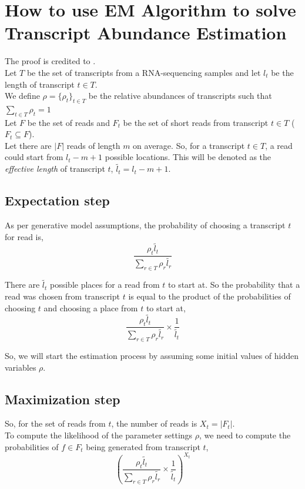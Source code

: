\section{How to use EM Algorithm to solve Transcript Abundance Estimation}
The proof is credited to \cite{pachter2011models}.\\
Let $T$ be the set of transcripts from a RNA-sequencing samples and let $l_t$ be the length of transcript $t \in T$.\\
We define $\rho = \{\rho_t\}_{t \in T}$ be the relative abundances of transcripts such that $\sum_{t \in T}{\rho_t}=1$\\
Let $F$ be the set of reads and $F_t$ be the set of short reads from transcript $t \in T$ ($F_t \subseteq F$).\\
 Let there are $\lvert F \rvert$ reads of length $m$ on average. So, for a transcript $t \in T$, a read could start from $l_t-m+1$ possible locations. This will be denoted as the \textit{effective length} of transcript $t$, $\tilde{l_t}= l_t-m+1$.\\

\subsection{Expectation step} 
As per generative model assumptions, the probability of choosing a transcript $t$ for read is,
\begin{displaymath}
\frac{ {\rho_t}{\tilde{l_t}}  }{ \sum_{r \in T}{ {\rho_r}{\tilde{l_r}}} }
\end{displaymath}

There are $\tilde{l_t}$ possible places for a read from $t$ to start at. So the probability that a read was chosen from transcript $t$ is equal to the product of the probabilities of choosing $t$ and choosing a place from $t$ to start at,
\begin{displaymath}
\frac{ {\rho_t} {\tilde{l_t}}  }{ \sum_{r \in T} { {\rho_r}{\tilde{l_r}}} }
\times \frac{1}{\tilde{l_t}}
\end{displaymath}    

So, we will start the estimation process by assuming some initial values of hidden variables $\rho$.
\subsection{Maximization step}

So, for the set of reads from $t$, the number of reads is $X_t= \lvert F_t \rvert$.\\
To compute the likelihood of the parameter settings $\rho$, we need to compute the probabilities of $f \in F_t$ being generated from transcript $t$,
\begin{displaymath}
{({\frac{ {\rho_t} {\tilde{l_t}}  }{ \sum_{r \in T} { {\rho_r}{\tilde{l_r}}} }
\times \frac{1}{\tilde{l_t}}
})}^{X_t}
\end{displaymath}


